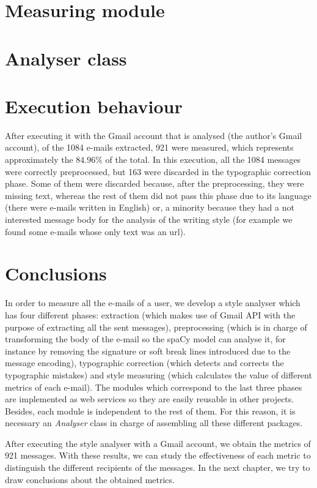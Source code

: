 \section{Measuring module} \label{section:measmod}


\section{Analyser class}\label{sect:analyserclass}


\section{Execution behaviour} \label{section:exebehav}
After executing it with the Gmail account that is analysed (the author's Gmail account), of the 1084 e-mails extracted, 921 were measured, which represents approximately the $84.96$\% of the total. In this execution, all the 1084 messages were correctly preprocessed, but 163 were discarded in the typographic correction phase. Some of them were discarded because, after the preprocessing, they were missing text, whereas the rest of them did not pass this phase due to its language (there were e-mails written in English) or, a minority because they had a not interested message body for the analysis of the writing style (for example we found some e-mails whose only text was an url).

\section{Conclusions}
In order to measure all the e-mails of a user, we develop a style analyser which has four different phases: extraction (which makes use of Gmail API with the purpose of extracting all the sent messages), preprocessing (which is in charge of transforming the body of the e-mail so the spaCy model can analyse it, for instance by removing the signature or soft break lines introduced due to the message encoding), typographic correction (which detects and corrects the typographic mistakes) and style measuring (which calculates the value of different metrics of each e-mail). The modules which correspond to the last three phases are implemented as web services so they are easily reusable in other projects. Besides, each module is independent to the rest of them. For this reason, it is necessary an \textit{Analyser} class in charge of assembling all these different packages.

After executing the style analyser with a Gmail account, we obtain the metrics of 921 messages. With these results, we can study the effectiveness of each metric to distinguish the different recipients of the messages. In the next chapter, we try to draw conclusions about the obtained metrics.